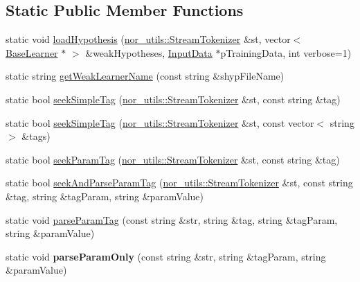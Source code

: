 \subsection*{Static Public Member Functions}
\begin{DoxyCompactItemize}
\item 
static void \hyperlink{classMultiBoost_1_1UnSerialization_af3c09b360fcf813aec472d250faa5cc1}{load\-Hypothesis} (\hyperlink{classnor__utils_1_1StreamTokenizer}{nor\-\_\-utils\-::\-Stream\-Tokenizer} \&st, vector$<$ \hyperlink{classMultiBoost_1_1BaseLearner}{Base\-Learner} $\ast$ $>$ \&weak\-Hypotheses, \hyperlink{classMultiBoost_1_1InputData}{Input\-Data} $\ast$p\-Training\-Data, int verbose=1)
\item 
static string \hyperlink{classMultiBoost_1_1UnSerialization_ad4348283d4bf8a414b3c099ce790a631}{get\-Weak\-Learner\-Name} (const string \&shyp\-File\-Name)
\item 
static bool \hyperlink{classMultiBoost_1_1UnSerialization_a5df00d73e915e5f6fed86143a886a09f}{seek\-Simple\-Tag} (\hyperlink{classnor__utils_1_1StreamTokenizer}{nor\-\_\-utils\-::\-Stream\-Tokenizer} \&st, const string \&tag)
\item 
static bool \hyperlink{classMultiBoost_1_1UnSerialization_a2070b6344d4b4c7729cb5aa685b35fd7}{seek\-Simple\-Tag} (\hyperlink{classnor__utils_1_1StreamTokenizer}{nor\-\_\-utils\-::\-Stream\-Tokenizer} \&st, const vector$<$ string $>$ \&tags)
\item 
static bool \hyperlink{classMultiBoost_1_1UnSerialization_a6b70aa714607156c4bb0a06ee7d40420}{seek\-Param\-Tag} (\hyperlink{classnor__utils_1_1StreamTokenizer}{nor\-\_\-utils\-::\-Stream\-Tokenizer} \&st, const string \&tag)
\item 
static bool \hyperlink{classMultiBoost_1_1UnSerialization_a44d1d30c1f8c8c99ee0ff40c6413ee0d}{seek\-And\-Parse\-Param\-Tag} (\hyperlink{classnor__utils_1_1StreamTokenizer}{nor\-\_\-utils\-::\-Stream\-Tokenizer} \&st, const string \&tag, string \&tag\-Param, string \&param\-Value)
\item 
static void \hyperlink{classMultiBoost_1_1UnSerialization_a7b3827a3a1a78fec2cb33cec68424267}{parse\-Param\-Tag} (const string \&str, string \&tag, string \&tag\-Param, string \&param\-Value)
\item 
\hypertarget{classMultiBoost_1_1UnSerialization_a90aeb99246e677ef7d55c92a95ed0e9c}{static void {\bfseries parse\-Param\-Only} (const string \&str, string \&tag\-Param, string \&param\-Value)}\label{classMultiBoost_1_1UnSerialization_a90aeb99246e677ef7d55c92a95ed0e9c}


\end{DoxyCompactItemize}
